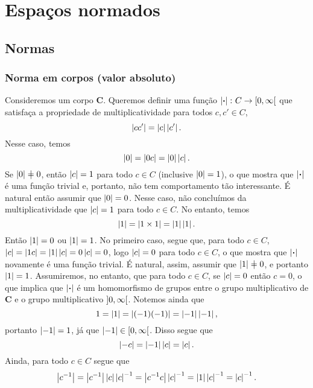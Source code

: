\chapter{Espaços normados}

\section{Normas}

\subsection{Norma em corpos (valor absoluto)}

Consideremos um corpo $\bm C$. Queremos definir uma função $\left\vert{\bm{\cdot}}\right\vert\colon C \to \left[0,\allowbreak \infty\right[$ que satisfaça a propriedade de multiplicatividade para todos $c,c' \in C$,
	\begin{equation*}
	\left\vert{cc'}\right\vert = \left\vert{c}\right\vert\left\vert{c'}\right\vert.
	\end{equation*}
Nesse caso, temos
	\begin{equation*}
	\left\vert{0}\right\vert=\left\vert{0c}\right\vert = \left\vert{0}\right\vert\left\vert{c}\right\vert.
	\end{equation*}
Se $\abs{0} \neq 0$, então $\left\vert{c}\right\vert=1$ para todo $c \in C$ (inclusive $\left\vert{0}\right\vert=1$), o que mostra que $\left\vert{\bm{\cdot}}\right\vert$ é uma função trivial e, portanto, não tem comportamento tão interessante. É natural então assumir que $\left\vert{0}\right\vert=0$. Nesse caso, não concluímos da multiplicatividade que $\left\vert{c}\right\vert=1$ para todo $c \in C$. No entanto, temos
	\begin{equation*}
	\left\vert{1}\right\vert = \left\vert{1 \times 1}\right\vert = \left\vert{1}\right\vert\left\vert{1}\right\vert.
	\end{equation*}
Então $\left\vert{1}\right\vert=0$ ou $\left\vert{1}\right\vert=1$. No primeiro caso, segue que, para todo $c \in C$, $\left\vert{c}\right\vert = \left\vert{1c}\right\vert = \left\vert{1}\right\vert\left\vert{c}\right\vert = 0 \left\vert{c}\right\vert = 0$, logo $\left\vert{c}\right\vert = 0$ para todo $c \in C$, o que mostra que $\left\vert{\bm{\cdot}}\right\vert$ novamente é uma função trivial. É natural, assim, assumir que $\abs{1} \neq 0$, e portanto $\left\vert{1}\right\vert=1$. Assumiremos, no entanto, que para todo $c \in C$, se $\left\vert{c}\right\vert = 0$ então $c=0$, o que implica que $\left\vert{\bm{\cdot}}\right\vert$ é um homomorfismo de grupos entre o grupo multiplicativo de $\bm C$ e o grupo multiplicativo $\left]0,\allowbreak \infty\right[$.
Notemos ainda que
	\begin{equation*}
	1 = \left\vert{1}\right\vert = \left\vert{(-1)(-1)}\right\vert = \left\vert{-1}\right\vert\left\vert{-1}\right\vert,
	\end{equation*}
portanto $\left\vert{-1}\right\vert = 1$, já que $\left\vert{-1}\right\vert \in \left[0,\allowbreak \infty\right[$. Disso segue que
	\begin{equation*}
	\left\vert{-c}\right\vert = \left\vert{-1}\right\vert\left\vert{c}\right\vert=\left\vert{c}\right\vert.
	\end{equation*}
Ainda, para todo $c \in C$ segue que
	\begin{equation*}
	\left\vert{c^{-1}}\right\vert = \left\vert{c^{-1}}\right\vert\left\vert{c}\right\vert\left\vert{c}\right\vert^{-1} = \left\vert{c^{-1}c}\right\vert\left\vert{c}\right\vert^{-1} = \left\vert{1}\right\vert\left\vert{c}\right\vert^{-1} = \left\vert{c}\right\vert^{-1}.
	\end{equation*}

